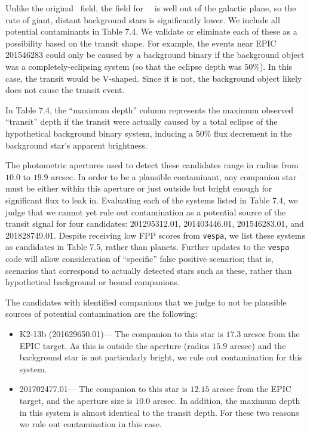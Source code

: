 Unlike the original \kep\ field, the field for \KT\ \Ci\ is
well out of the galactic plane, so the rate of giant, distant background
stars is significantly lower.
We include all potential contaminants in Table 7.4.
We validate or eliminate each of these as a possibility based on the transit shape.
For example, the events near EPIC 201546283 could only be caused by a
background binary if the background object was a completely-eclipsing system
(so that the eclipse depth was $50\%$).
In this case, the transit would be V-shaped.
Since it is not, the background object likely does not cause
the transit event.


In Table 7.4, the ``maximum depth'' column represents
the maximum observed ``transit'' depth if the transit were actually caused
by a total eclipse of the hypothetical background binary system, inducing
a 50\% flux decrement in the background star's apparent brightness.

The photometric apertures used to detect these candidates range in radius from
$10.0$ to $19.9$ arcsec.  In order to be a plausible contaminant,
any companion star must
be either within this aperture or just outside but bright
enough for significant flux to leak in.
Evaluating each of the systems listed in Table 7.4, we judge that we cannot yet
rule out contamination as a potential source of the transit signal for four
candidates: 201295312.01, 201403446.01, 201546283.01, and 201828749.01.
Despite receiving
low FPP scores from \texttt{vespa}, we list these systems as candidates in
Table 7.5, rather than planets.  Further updates to the \texttt{vespa} code
will allow consideration of ``specific'' false positive scenarios; that is,
scenarios that correspond to actually detected stars such as these, rather than
hypothetical background or bound companions.

The candidates with identified companions that we judge to not be plausible
sources of potential contamination are the following:
\begin{itemize}


\item K2-13b (201629650.01)--- The companion to this star is $17.3$ arcsec from
the EPIC target.  As this is outside the aperture
(radius $15.9$ arcsec) and the background star is not particularly bright,
we rule out contamination for this system.

\item 201702477.01--- The companion to this star is $12.15$ arcsec from the
EPIC target, and the aperture size is $10.0$ arcsec.  In addition,
the maximum depth in this system is almost identical to the transit depth.
For these two reasons we rule out contamination in this case.

\end{itemize}

